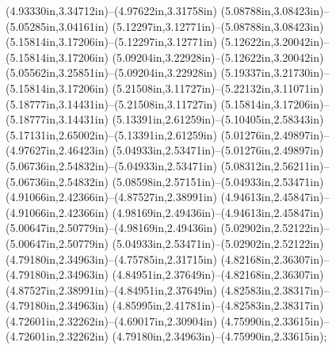 (4.93330in,3.34712in)--(4.97622in,3.31758in) (5.08788in,3.08423in)--(5.05285in,3.04161in) (5.12297in,3.12771in)--(5.08788in,3.08423in) (5.15814in,3.17206in)--(5.12297in,3.12771in) (5.12622in,3.20042in)--(5.15814in,3.17206in) (5.09204in,3.22928in)--(5.12622in,3.20042in) (5.05562in,3.25851in)--(5.09204in,3.22928in) (5.19337in,3.21730in)--(5.15814in,3.17206in) (5.21508in,3.11727in)--(5.22132in,3.11071in) (5.18777in,3.14431in)--(5.21508in,3.11727in) (5.15814in,3.17206in)--(5.18777in,3.14431in) (5.13391in,2.61259in)--(5.10405in,2.58343in) (5.17131in,2.65002in)--(5.13391in,2.61259in) (5.01276in,2.49897in)--(4.97627in,2.46423in) (5.04933in,2.53471in)--(5.01276in,2.49897in) (5.06736in,2.54832in)--(5.04933in,2.53471in) (5.08312in,2.56211in)--(5.06736in,2.54832in) (5.08598in,2.57151in)--(5.04933in,2.53471in) (4.91066in,2.42366in)--(4.87527in,2.38991in) (4.94613in,2.45847in)--(4.91066in,2.42366in) (4.98169in,2.49436in)--(4.94613in,2.45847in) (5.00647in,2.50779in)--(4.98169in,2.49436in) (5.02902in,2.52122in)--(5.00647in,2.50779in) (5.04933in,2.53471in)--(5.02902in,2.52122in) (4.79180in,2.34963in)--(4.75785in,2.31715in) (4.82168in,2.36307in)--(4.79180in,2.34963in) (4.84951in,2.37649in)--(4.82168in,2.36307in) (4.87527in,2.38991in)--(4.84951in,2.37649in) (4.82583in,2.38317in)--(4.79180in,2.34963in) (4.85995in,2.41781in)--(4.82583in,2.38317in) (4.72601in,2.32262in)--(4.69017in,2.30904in) (4.75990in,2.33615in)--(4.72601in,2.32262in) (4.79180in,2.34963in)--(4.75990in,2.33615in);
